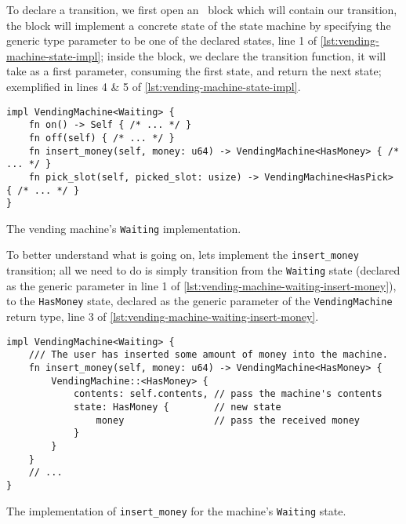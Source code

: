 To declare a transition, we first open an \footnotemark~block which will contain our transition,
the block will implement a concrete state of the state machine by specifying the generic type parameter to be one of the declared states, line 1 of \autoref{lst:vending-machine-state-impl};
inside the block, we declare the transition function, it will take  as a first parameter, consuming the first state, and return the next state;
exemplified in lines 4 \& 5 of \autoref{lst:vending-machine-state-impl}.

\begin{listing}
    \begin{verbatim}
impl VendingMachine<Waiting> {
    fn on() -> Self { /* ... */ }
    fn off(self) { /* ... */ }
    fn insert_money(self, money: u64) -> VendingMachine<HasMoney> { /* ... */ }
    fn pick_slot(self, picked_slot: usize) -> VendingMachine<HasPick> { /* ... */ }
}
\end{verbatim}
    \caption[test]{The vending machine's \texttt{Waiting} implementation\footnotemark.}
    \label{lst:vending-machine-state-impl}
\end{listing}

To better understand what is going on, lets implement the \texttt{insert\_money} transition;
all we need to do is simply transition from the \texttt{Waiting} state (declared as the generic parameter in line 1 of \autoref{lst:vending-machine-waiting-insert-money}),
to the \texttt{HasMoney} state, declared as the generic parameter of the \texttt{VendingMachine} return type, line 3 of \autoref{lst:vending-machine-waiting-insert-money}.

\begin{listing}
    \begin{verbatim}
impl VendingMachine<Waiting> {
    /// The user has inserted some amount of money into the machine.
    fn insert_money(self, money: u64) -> VendingMachine<HasMoney> {
        VendingMachine::<HasMoney> {
            contents: self.contents, // pass the machine's contents
            state: HasMoney {        // new state
                money                // pass the received money
            }
        }
    }
    // ...
}
\end{verbatim}
    \caption{The implementation of \texttt{insert\_money} for the machine's \texttt{Waiting} state.}
    \label{lst:vending-machine-waiting-insert-money}
\end{listing}

